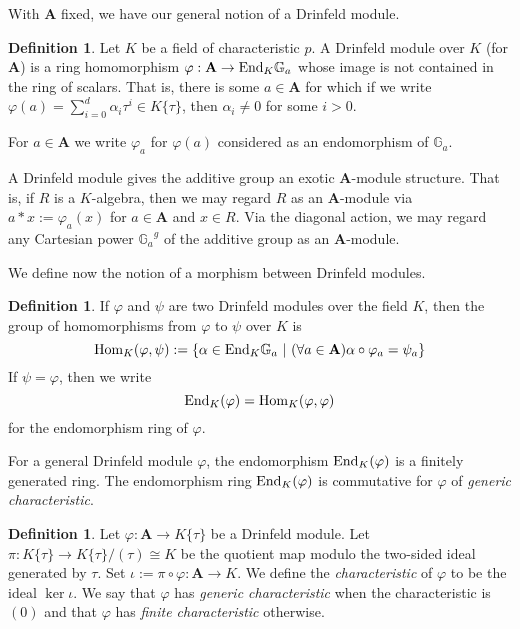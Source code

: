 \documentclass{amsart}
\newcommand{\Ga}{{{\mathbb G}_a}}
\newcommand{\bA}{{\mathbf A}}
\theoremstyle{definition}
\newtheorem{Def}[thm]{Definition}
\theoremstyle{remark}
\begin{document}
With ${\mathbf A}$ fixed, we have our general notion of a Drinfeld
module.

\begin{Def}
Let $K$ be a field of characteristic $p$.  A Drinfeld module over
$K$ (for ${\mathbf A}$) is a ring homomorphism $\varphi: {\mathbf A} \to {\rm End}_K \Ga$
whose image is not contained in the ring of scalars.  That is, there is
some $a \in {\mathbf A}$ for which if we write $\varphi(a) = \sum_{i=0}^d \alpha_i \tau^i 
\in K \{ \tau \}$, then $\alpha_i \neq 0$ for some $i > 0$.

For $a \in {\mathbf A}$ we write $\varphi_a$ for $\varphi(a)$ considered as an 
endomorphism of $\Ga$.
\end{Def}


A Drinfeld module gives the additive group an exotic ${\mathbf A}$-module structure.
That is, if $R$ is a $K$-algebra, then we may regard $R$ as an ${\mathbf A}$-module
via $a*x := \varphi_a(x)$ for $a \in {\mathbf A}$ and $x \in R$.  Via the diagonal
action, we may regard any Cartesian power $\Ga^g$ of the additive group as 
an ${\mathbf A}$-module.  

We define now the notion of a morphism between Drinfeld modules.

\begin{Def}
If $\varphi$ and $\psi$ are two Drinfeld modules over the field $K$,
then the group of homomorphisms from $\varphi$ to $\psi$ over 
$K$ is 
$${\rm Hom}_K(\varphi, \psi) := \{ \alpha \in {\rm End}_K \Ga \ \vert \ (\forall a \in {\mathbf A}) 
\alpha \circ \varphi_a = \psi_a \}$$  If $\psi = \varphi$, then we write 
$${\rm End}_K(\varphi) = {\rm Hom}_K(\varphi, \varphi)$$ for the endomorphism ring of $\varphi$.
\end{Def}



For a general Drinfeld module $\varphi$, the endomorphism ${\rm End}_K(\varphi)$ is a finitely
generated ring.  The endomorphism ring ${\rm End}_K(\varphi)$ is commutative for 
$\varphi$ of \emph{generic characteristic}.

\begin{Def}
Let $\varphi:\bA \to K \{ \tau \}$ be a Drinfeld module.  Let $\pi:K \{ \tau \} \to 
K \{ \tau \} / (\tau) \cong K$ be the quotient map modulo the two-sided ideal generated by $\tau$.
Set $\iota := \pi \circ \varphi: \bA \to K$.   We define the \emph{characteristic} of $\varphi$ 
to be the ideal $\ker \iota$.  We say that $\varphi$ has \emph{generic characteristic} when 
the characteristic is $(0)$ and that $\varphi$ has \emph{finite characteristic} otherwise.
\end{Def}
\end{document}
